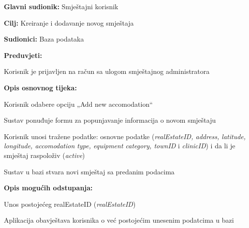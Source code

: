 					
					\noindent {}
					\begin{packed_item}
						\item \textbf{Glavni sudionik:} Smještajni korisnik
						\item  \textbf{Cilj:} Kreiranje i dodavanje novog smještaja
						\item  \textbf{Sudionici:} Baza podataka
						\item  \textbf{Preduvjeti:}
						\item[] \begin{packed_enum}
							\item Korisnik je prijavljen na račun sa ulogom smještajnog administratora
						\end{packed_enum}
						
						\item  \textbf{Opis osnovnog tijeka:}
						\item[] \begin{packed_enum}
							\item Korisnik odabere opciju „Add new accomodation“
							\item Sustav ponuđuje formu za popunjavanje informacija o novom smještaju
							\item Korisnik unosi tražene podatke: osnovne podatke (\textit{realEstateID, address, latitude, longitude, accomodation type, equipment category, townID} i \textit{clinicID}) i da li je smještaj raspoloživ (\textit{active})
							\item Sustav u bazi stvara novi smještaj sa predanim podacima
						\end{packed_enum}
						
						\item  \textbf{Opis mogućih odstupanja:}
						\item[] \begin{packed_item}
							\item[3.a] Unos postojećeg realEstateID (\textit{realEstateID})
							\item[] \begin{packed_enum}
								\item Aplikacija obavještava korisnika o već postojećim unesenim podatcima u bazi
							\end{packed_enum}
						\end{packed_item}
					\end{packed_item}
					
